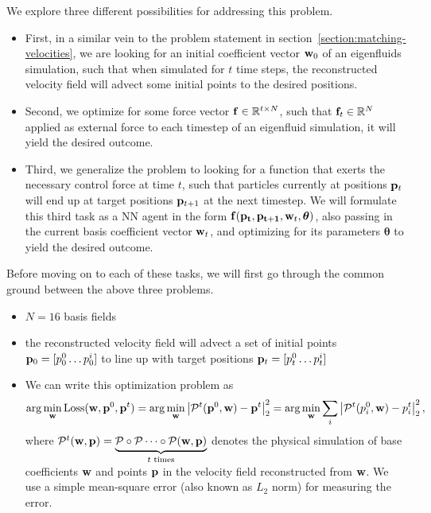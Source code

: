 We explore three different possibilities for addressing this problem. 
\begin{itemize}
  \item First, in a similar vein to the problem statement in
    section~\ref{section:matching-velocities}, we are looking for an initial
    coefficient vector $\vb{w}_0$ of an eigenfluids simulation, such that when
    simulated for $t$ time steps, the reconstructed velocity field will advect
    some initial points to the desired positions.
  \item Second, we optimize for some force vector $\vb{f}\in \mathbb{R}^{t\times
    N}$, such that $\vb{f}_t \in \mathbb{R}^N$ applied as external force to each
    timestep of an eigenfluid simulation, it will yield the desired outcome.
  \item Third, we generalize the problem to looking for a function that exerts
    the necessary control force at time $t$, such that particles currently at
    positions $\vb{p}_t$ will end up at target positions $\vb{p}_{t+1}$ at the
    next timestep. We will formulate this third task as a \acf{NN}
    agent in the form $\vb{f}(\vb{p_t}, \vb{p_{t+1}}, \vb{w}_{t},
    \boldsymbol\theta)$,
    also passing in the current basis coefficient vector $\vb{w}_t$, and
    optimizing for its parameters $\boldsymbol\theta$ to yield the desired outcome.
\end{itemize}

Before moving on to each of these tasks, we will first go through the common
ground between the above three problems.


\begin{itemize}
  \item $N=16$ basis fields
  \item the reconstructed velocity field will advect a set of initial points
$\vb{p}_0 = [p^0_0\dots p^i_0]$ to line up with target positions 
$\vb{p}_{t} = [p_t^0\dots p_t^i]$
  \item We can write this optimization problem as 
$$\arg\min_{\vb{w}} \text{Loss}(\vb{w}, \vb{p}^0, \vb{p}^t)
= \arg\min_{\vb{w}} \left| \mathcal{P}^{t}(\vb{p}^0, \vb{w})
- \vb{p}^t\right|_2^2 = \arg\min_{\vb{w}}
\sum_{i}\left|\mathcal{P}^{t}(p^0_i, \vb{w}) - p^t_i\right|_2^2, $$
where $\mathcal{P}^t(\vb{w}, \vb{p}) = \underbrace{\mathcal{P} \circ
\mathcal{P} \dots \circ \mathcal{P}(\vb{w}, \vb{p})}_{t \text{ times}}$
denotes the physical simulation of base coefficients $\vb{w}$ and 
points $\vb{p}$ in the velocity field reconstructed from $\vb{w}$. We
use a simple mean-square error (also known as $L_2$ norm) for measuring the error.
\end{itemize}


